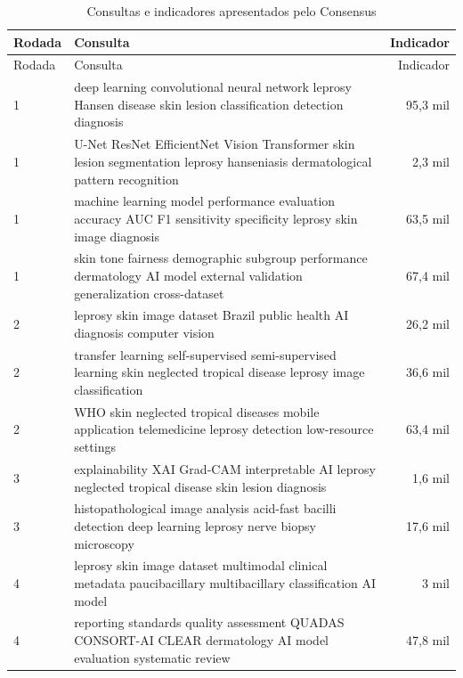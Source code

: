 \begingroup
\small
\begin{longtable}{|p{}|p{}|r|}
	\caption{Consultas e indicadores apresentados pelo Consensus}\label{tab:consultas-consensus} \\ \hline
	Rodada          & Consulta                                                                                                                     & Indicador \\ \hline
	\endfirsthead
	\hline Rodada & Consulta                                                                                                                     & Indicador \\ \hline
	\endhead
	1               & deep learning convolutional neural network leprosy Hansen disease skin lesion classification detection diagnosis             & 95,3 mil  \\ \hline
	1               & U-Net ResNet EfficientNet Vision Transformer skin lesion segmentation leprosy hanseniasis dermatological pattern recognition & 2,3 mil   \\ \hline
	1               & machine learning model performance evaluation accuracy AUC F1 sensitivity specificity leprosy skin image diagnosis           & 63,5 mil  \\ \hline
	1               & skin tone fairness demographic subgroup performance dermatology AI model external validation generalization cross-dataset    & 67,4 mil  \\ \hline
	2               & leprosy skin image dataset Brazil public health AI diagnosis computer vision                                                 & 26,2 mil  \\ \hline
	2               & transfer learning self-supervised semi-supervised learning skin neglected tropical disease leprosy image classification      & 36,6 mil  \\ \hline
	2               & WHO skin neglected tropical diseases mobile application telemedicine leprosy detection low-resource settings                 & 63,4 mil  \\ \hline
	3               & explainability XAI Grad-CAM interpretable AI leprosy neglected tropical disease skin lesion diagnosis                        & 1,6 mil   \\ \hline
	3               & histopathological image analysis acid-fast bacilli detection deep learning leprosy nerve biopsy microscopy                   & 17,6 mil  \\ \hline
	4               & leprosy skin image dataset multimodal clinical metadata paucibacillary multibacillary classification AI model                & 3 mil     \\ \hline
	4               & reporting standards quality assessment QUADAS CONSORT-AI CLEAR dermatology AI model evaluation systematic review             & 47,8 mil  \\ \hline
\end{longtable}
\endgroup
{}

